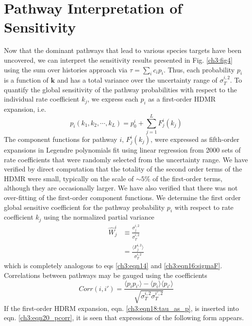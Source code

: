 \section{Pathway Interpretation of Sensitivity}
\label{path_inter_s}
Now that the dominant pathways that lead to various species
targets have been uncovered, we can interpret the sensitivity
results presented in Fig. \ref{ch3:fig4} using the sum over histories
approach via $\tau = \sum_{i}{c_ip_i}$. Thus, each probability $p_i$ is a function of
$\mathbf{k}$ and has a total variance over the uncertainty range of $\sigma_{T}^{i,2}$. To
quantify the global sensitivity of the pathway probabilities with
respect to the individual rate coefficient $k_j$, we express each $p_i$ as
a first-order HDMR expansion, i.e.
\begin{equation}
\label{ch3:eqn18:tau_as_p}
p_i(k_1,k_2,\cdots,k_L) = p_{0}^{i} + \sum_{j=1}^{L}{F_j^i(k_j)}
\end{equation}
The component functions for pathway $i$, $F_j^i(k_j)$, were
expressed as fifth-order expansions in Legendre polynomials
fit using linear regression from 2000 sets of rate coefficients that
were randomly selected from the uncertainty range. We have
verified by direct computation that the totality of the second order
terms of the HDMR were small, typically on the scale of $\sim 5\%$ of the first-order terms, although they are occasionally
larger. We have also verified that there was not over-fitting of
the first-order component functions. We determine the first order
global sensitive coefficient for the pathway probability $p_i$ with respect to rate coefficient $k_j$ using the normalized partial variance
\begin{equation}
\label{ch3:eqn19:W_def}
\begin{split}
\widehat{W}_j^{i} &\equiv \frac{\sigma_j^{i,2}}{\sigma_T^{i,2}} \\
&= \frac{ \langle F_j^{i,2} \rangle }{\sigma_T^{i,2}}
\end{split}
\end{equation}
which is completely analogous to eqs \ref{ch3:eqn14} and \ref{ch3:eqn16:sigmaF}.
Correlations between pathways may be gauged using the coefficients
\begin{equation}
\label{ch3:eqn20_pcorr}
Corr(i,i\prime) = \frac{ \langle p_ip_{i\prime} \rangle - \langle p_i \rangle \langle p_{i\prime} \rangle  }{\sqrt{\sigma_T^{i,2}\sigma_T^{i\prime,2}}}
\end{equation}
If the first-order HDRM expansion, eqn. \ref{ch3:eqn18:tau_as_p}, is inserted into eqn. \ref{ch3:eqn20_pcorr}, it is seen that expressions of the following form appears.
